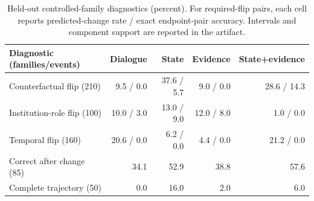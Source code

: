 \begin{table}[t]
\caption{Held-out controlled-family diagnostics (percent). For required-flip pairs, each cell reports predicted-change rate / exact endpoint-pair accuracy. Intervals and component support are reported in the artifact.}
\label{tab:family-diagnostics}
\centering
\small
\setlength{\tabcolsep}{5pt}
\begin{tabular}{@{}lrrrr@{}}
\toprule
Diagnostic (families/events) & Dialogue & State & Evidence & State+evidence \\
\midrule
Counterfactual flip (210) & 9.5 / 0.0 & 37.6 / 5.7 & 9.0 / 0.0 & 28.6 / 14.3 \\
Institution-role flip (100) & 10.0 / 3.0 & 13.0 / 9.0 & 12.0 / 8.0 & 1.0 / 0.0 \\
Temporal flip (160) & 20.6 / 0.0 & 6.2 / 0.0 & 4.4 / 0.0 & 21.2 / 0.0 \\
Correct after change (85) & 34.1 & 52.9 & 38.8 & 57.6 \\
Complete trajectory (50) & 0.0 & 16.0 & 2.0 & 6.0 \\
\bottomrule
\end{tabular}
\end{table}
